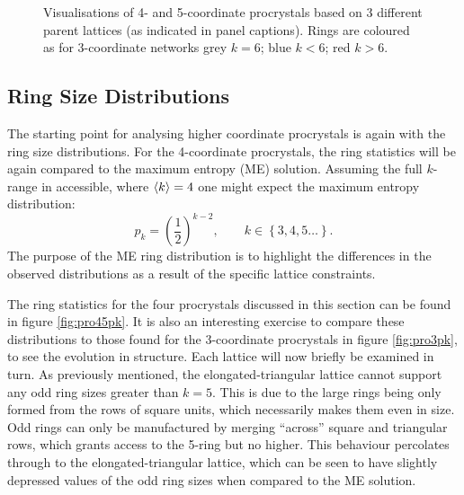 \begin{figure}[bt]
     \caption{Visualisations of 4\-- and 5\--coordinate procrystals based on 3 different parent lattices (as indicated in panel captions). Rings are coloured as for 3\--coordinate networks \ie{} grey $k=6$; blue $k<6$; red $k>6$.}
     \label{fig:pro45}
\end{figure}

\subsection{Ring Size Distributions}

The starting point for analysing higher coordinate procrystals is again with the ring size distributions.
For the 4\--coordinate procrystals, the ring statistics will be again compared to the maximum entropy (ME) solution.
Assuming the full $k$\--range in accessible, where $\langle k \rangle=4$ one might expect the maximum entropy distribution:
\begin{equation}
	p_k = \left(\frac{1}{2}\right)^{k-2}, \qquad k\in\left\{3,4,5\dots\right\}.
\end{equation}
The purpose of the ME ring distribution is to highlight the differences in the observed distributions as a result of the specific lattice constraints.

The ring statistics for the four procrystals discussed in this section can be found in figure \ref{fig:pro45pk}.
It is also an interesting exercise to compare these distributions to those found for the 3\--coordinate procrystals in figure \ref{fig:pro3pk}, to see the evolution in structure.
Each lattice will now briefly be examined in turn.
As previously mentioned, the elongated\--triangular lattice cannot support any odd ring sizes greater than $k=5$. 
This is due to the large rings being only formed from the rows of square units, which necessarily makes them even in size.
Odd rings can only be manufactured by merging ``across'' square and triangular rows, which grants access to the 5\--ring but no higher.
This behaviour percolates through to the elongated\--triangular lattice, which can be seen to have slightly depressed values of the odd ring sizes when compared to the ME solution.



